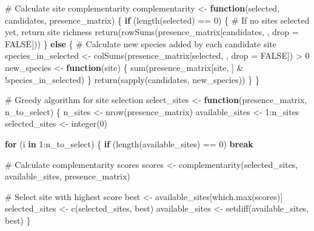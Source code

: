 \documentclass[
  letterpaper,
]{book}
\newenvironment{Shaded}{\begin{snugshade}}{\end{snugshade}}
\newcommand{\AttributeTok}[1]{\textcolor[rgb]{0.40,0.45,0.13}{#1}}
\newcommand{\CommentTok}[1]{\textcolor[rgb]{0.37,0.37,0.37}{#1}}
\newcommand{\ConstantTok}[1]{\textcolor[rgb]{0.56,0.35,0.01}{#1}}
\newcommand{\ControlFlowTok}[1]{\textcolor[rgb]{0.00,0.23,0.31}{\textbf{#1}}}
\newcommand{\DecValTok}[1]{\textcolor[rgb]{0.68,0.00,0.00}{#1}}
\newcommand{\FunctionTok}[1]{\textcolor[rgb]{0.28,0.35,0.67}{#1}}
\newcommand{\NormalTok}[1]{\textcolor[rgb]{0.00,0.23,0.31}{#1}}
\newcommand{\OtherTok}[1]{\textcolor[rgb]{0.00,0.23,0.31}{#1}}
\newcommand{\SpecialCharTok}[1]{\textcolor[rgb]{0.37,0.37,0.37}{#1}}
\begin{document}
\begin{Shaded}
\begin{Highlighting}[]
\CommentTok{\# Calculate site complementarity}
\NormalTok{complementarity }\OtherTok{\textless{}{-}} \ControlFlowTok{function}\NormalTok{(selected, candidates, presence\_matrix) \{}
  \ControlFlowTok{if}\NormalTok{ (}\FunctionTok{length}\NormalTok{(selected) }\SpecialCharTok{==} \DecValTok{0}\NormalTok{) \{}
    \CommentTok{\# If no sites selected yet, return site richness}
    \FunctionTok{return}\NormalTok{(}\FunctionTok{rowSums}\NormalTok{(presence\_matrix[candidates, , }\AttributeTok{drop =} \ConstantTok{FALSE}\NormalTok{]))}
\NormalTok{  \} }\ControlFlowTok{else}\NormalTok{ \{}
    \CommentTok{\# Calculate new species added by each candidate site}
\NormalTok{    species\_in\_selected }\OtherTok{\textless{}{-}} \FunctionTok{colSums}\NormalTok{(presence\_matrix[selected, , }\AttributeTok{drop =} \ConstantTok{FALSE}\NormalTok{]) }\SpecialCharTok{\textgreater{}} \DecValTok{0}
\NormalTok{    new\_species }\OtherTok{\textless{}{-}} \ControlFlowTok{function}\NormalTok{(site) \{}
      \FunctionTok{sum}\NormalTok{(presence\_matrix[site, ] }\SpecialCharTok{\&} \SpecialCharTok{!}\NormalTok{species\_in\_selected)}
\NormalTok{    \}}
    \FunctionTok{return}\NormalTok{(}\FunctionTok{sapply}\NormalTok{(candidates, new\_species))}
\NormalTok{  \}}
\NormalTok{\}}

\CommentTok{\# Greedy algorithm for site selection}
\NormalTok{select\_sites }\OtherTok{\textless{}{-}} \ControlFlowTok{function}\NormalTok{(presence\_matrix, n\_to\_select) \{}
\NormalTok{  n\_sites }\OtherTok{\textless{}{-}} \FunctionTok{nrow}\NormalTok{(presence\_matrix)}
\NormalTok{  available\_sites }\OtherTok{\textless{}{-}} \DecValTok{1}\SpecialCharTok{:}\NormalTok{n\_sites}
\NormalTok{  selected\_sites }\OtherTok{\textless{}{-}} \FunctionTok{integer}\NormalTok{(}\DecValTok{0}\NormalTok{)}
  
  \ControlFlowTok{for}\NormalTok{ (i }\ControlFlowTok{in} \DecValTok{1}\SpecialCharTok{:}\NormalTok{n\_to\_select) \{}
    \ControlFlowTok{if}\NormalTok{ (}\FunctionTok{length}\NormalTok{(available\_sites) }\SpecialCharTok{==} \DecValTok{0}\NormalTok{) }\ControlFlowTok{break}
    
    \CommentTok{\# Calculate complementarity scores}
\NormalTok{    scores }\OtherTok{\textless{}{-}} \FunctionTok{complementarity}\NormalTok{(selected\_sites, available\_sites, presence\_matrix)}
    
    \CommentTok{\# Select site with highest score}
\NormalTok{    best }\OtherTok{\textless{}{-}}\NormalTok{ available\_sites[}\FunctionTok{which.max}\NormalTok{(scores)]}
\NormalTok{    selected\_sites }\OtherTok{\textless{}{-}} \FunctionTok{c}\NormalTok{(selected\_sites, best)}
\NormalTok{    available\_sites }\OtherTok{\textless{}{-}} \FunctionTok{setdiff}\NormalTok{(available\_sites, best)}
\NormalTok{  \}}
  

\end{Highlighting}
\end{Shaded}
\end{document}

